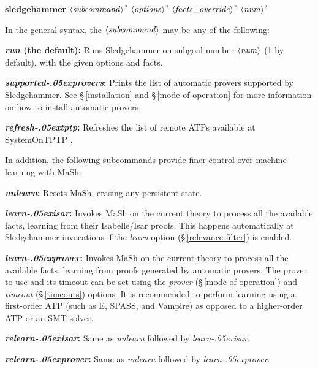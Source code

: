 \documentclass[a4paper,12pt]{article}
\let\oldS=\S
\def\S{\oldS\,}
\def\qty#1{\ensuremath{\left<\mathit{#1\/}\right>}}
\renewcommand\_{\hbox{\textunderscore\kern-.05ex}}
\begin{document}
\prew
\textbf{sledgehammer} \qty{subcommand}$^?$ \qty{options}$^?$ \qty{facts\_override}$^?$ \qty{num}$^?$
\postw

In the general syntax, the \qty{subcommand} may be any of the following:

\begin{enum}
\item[\labelitemi] \textbf{\textit{run} (the default):} Runs Sledgehammer on
subgoal number \qty{num} (1 by default), with the given options and facts.

\item[\labelitemi] \textbf{\textit{supported\_provers}:} Prints the list of
automatic provers supported by Sledgehammer. See \S\ref{installation} and
\S\ref{mode-of-operation} for more information on how to install automatic
provers.

\item[\labelitemi] \textbf{\textit{refresh\_tptp}:} Refreshes the list of remote
ATPs available at System\-On\-TPTP \cite{sutcliffe-2000}.
\end{enum}

In addition, the following subcommands provide finer control over machine
learning with MaSh:

\begin{enum}
\item[\labelitemi] \textbf{\textit{unlearn}:} Resets MaSh, erasing any
persistent state.

\item[\labelitemi] \textbf{\textit{learn\_isar}:} Invokes MaSh on the current
theory to process all the available facts, learning from their Isabelle/Isar
proofs. This happens automatically at Sledgehammer invocations if the
\textit{learn} option (\S\ref{relevance-filter}) is enabled.

\item[\labelitemi] \textbf{\textit{learn\_prover}:} Invokes MaSh on the current
theory to process all the available facts, learning from proofs generated by
automatic provers. The prover to use and its timeout can be set using the
\textit{prover} (\S\ref{mode-of-operation}) and \textit{timeout}
(\S\ref{timeouts}) options. It is recommended to perform learning using a
first-order ATP (such as E, SPASS, and Vampire) as opposed to a
higher-order ATP or an SMT solver.

\item[\labelitemi] \textbf{\textit{relearn\_isar}:} Same as \textit{unlearn}
followed by \textit{learn\_isar}.

\item[\labelitemi] \textbf{\textit{relearn\_prover}:} Same as \textit{unlearn}
followed by \textit{learn\_prover}.
\end{enum}
\end{document}
